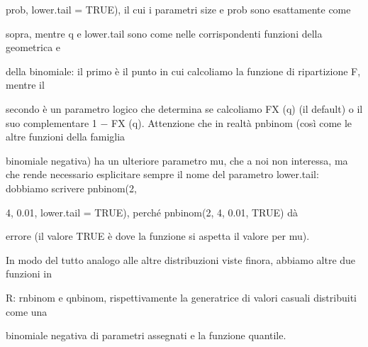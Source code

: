 \documentclass[a4paper,portrait,12pt]{article}
\begin{document}
\begin{flushleft}
prob, lower.tail = TRUE), il cui i parametri size e prob sono esattamente come
\end{flushleft}


\begin{flushleft}
sopra, mentre q e lower.tail sono come nelle corrispondenti funzioni della geometrica e
\end{flushleft}


\begin{flushleft}
della binomiale: il primo \`{e} il punto in cui calcoliamo la funzione di ripartizione F, mentre il
\end{flushleft}


\begin{flushleft}
secondo \`{e} un parametro logico che determina se calcoliamo FX (q) (il default) o il suo complementare 1 $-$ FX (q). Attenzione che in realt\`{a} pnbinom (così come le altre funzioni della famiglia
\end{flushleft}


\begin{flushleft}
binomiale negativa) ha un ulteriore parametro mu, che a noi non interessa, ma che rende necessario esplicitare sempre il nome del parametro lower.tail: dobbiamo scrivere pnbinom(2,
\end{flushleft}


\begin{flushleft}
4, 0.01, lower.tail = TRUE), perch\'{e} pnbinom(2, 4, 0.01, TRUE) d\`{a}
\end{flushleft}


\begin{flushleft}
errore (il valore TRUE \`{e} dove la funzione si aspetta il valore per mu).
\end{flushleft}


\begin{flushleft}
In modo del tutto analogo alle altre distribuzioni viste finora, abbiamo altre due funzioni in
\end{flushleft}


\begin{flushleft}
R: rnbinom e qnbinom, rispettivamente la generatrice di valori casuali distribuiti come una
\end{flushleft}


\begin{flushleft}
binomiale negativa di parametri assegnati e la funzione quantile.
\end{flushleft}
\end{document}
